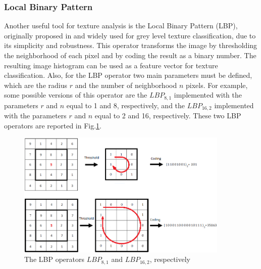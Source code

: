\documentclass[final,a4paper,12pt,english]{UnicaPhdThesis3}
\begin{document}
\subsubsection{Local Binary Pattern} \label{LBP}
Another useful tool for texture analysis is the Local Binary Pattern (\acs{LBP}), originally proposed in \cite{Ojala} and widely used for grey level texture classification, due to its simplicity and robustness. This operator transforms the image by thresholding the neighborhood of each pixel and by coding the result as a binary number. The resulting image histogram can be used as a feature vector for texture classification. Also, for the LBP operator two main parameters must be defined, which are the radius $r$ and the number of neighborhood $n$ pixels. For example, some possible versions of this operator are the $LBP_{8,1}$ implemented with the parameters $r$ and $n$ equal to 1 and 8, respectively, and the  $LBP_{16,2}$ implemented with the parameters $r$ and $n$ equal to 2 and 16, respectively. These two LBP operators are reported in Fig.\ref{fig:LBP}.

\begin{figure}[!t]
	\centering
	\includegraphics[width=0.90\textwidth]{images/LBP}
	\caption{\label{fig:LBP}The LBP operators $LBP_{8,1}$  and $LBP_{16,2}$, respectively  }
\end{figure}
\end{document}
